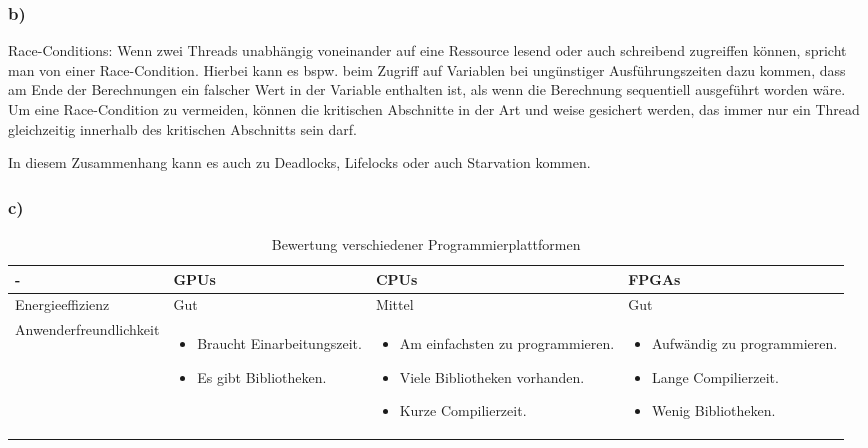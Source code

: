 \documentclass{report}
\begin{document}
        \subsubsection{b)}
        Race-Conditions: Wenn zwei Threads unabhängig voneinander auf eine Ressource lesend oder auch schreibend zugreiffen können, 
        spricht man von einer Race-Condition. Hierbei kann es bspw. beim Zugriff auf Variablen bei ungünstiger Ausführungszeiten
        dazu kommen, dass am Ende der Berechnungen ein falscher Wert in der Variable enthalten ist, als wenn die Berechnung sequentiell 
        ausgeführt worden wäre.
        Um eine Race-Condition zu vermeiden, können die kritischen Abschnitte in der Art und weise gesichert werden, das immer nur ein 
        Thread gleichzeitig innerhalb des kritischen Abschnitts sein darf.

        In diesem Zusammenhang kann es auch zu Deadlocks, Lifelocks oder auch Starvation kommen. 
        \subsubsection{c)}
        \begin{table}
        	\centering
        \begin{tabular}{|p{4cm}|p{3cm}|p{3cm}|p{3cm}|}
        	\hline
        	- & GPUs & CPUs & FPGAs \\
        	\hline
        	Energieeffizienz & Gut & Mittel & Gut  \\
        	\hline
        	Anwenderfreundlichkeit & \begin{itemize}
        		\item Braucht Einarbeitungszeit.
        		\item Es gibt Bibliotheken.
        	\end{itemize} & 
        \begin{itemize}
        	\item Am einfachsten zu programmieren.
        	\item Viele Bibliotheken vorhanden. 
        	\item Kurze Compilierzeit.
        \end{itemize}  & \begin{itemize}
        \item Aufwändig zu programmieren.
        \item Lange Compilierzeit.
        \item Wenig Bibliotheken.
    \end{itemize}  \\
        	\hline
        \end{tabular}
        \caption{Bewertung verschiedener Programmierplattformen}
        \label{Table:3c}
        \end{table}
    
\end{document}

